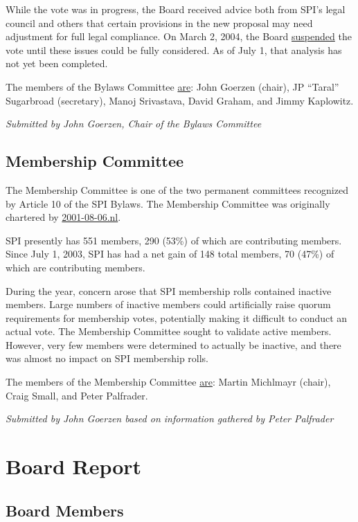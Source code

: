 \documentclass[letterpaper]{report}
\begin{document}
While the vote was in progress, the Board received advice both from
SPI's legal council and others that certain provisions in the new
proposal may need adjustment for full legal compliance. On March 2,
2004, the Board \href{http://lists.spi-inc.org/pipermail/spi-announce/2004/000073.html}{suspended}
the vote until these issues could be fully considered. As of July
1, that analysis has not yet been completed.

The members of the Bylaws Committee \href{http://lists.spi-inc.org/pipermail/spi-bylaws/2003/000003.html}{are}:
John Goerzen (chair), JP ``Taral'' Sugarbroad (secretary), Manoj
Srivastava, David Graham, and Jimmy Kaplowitz.

\emph{Submitted by John Goerzen, Chair of the Bylaws Committee}


\section{Membership Committee}

The Membership Committee is one of the two permanent committees recognized
by Article 10 of the SPI Bylaws. The Membership Committee was originally
chartered by \href{http://www.spi-inc.org/corporate/resolutions/2001/2001-08-06.nl}{2001-08-06.nl}.

SPI presently has 551 members, 290 (53\%) of which are contributing
members. Since July 1, 2003, SPI has had a net gain of 148 total members,
70 (47\%) of which are contributing members.

During the year, concern arose that SPI membership rolls contained
inactive members. Large numbers of inactive members could artificially
raise quorum requirements for membership votes, potentially making
it difficult to conduct an actual vote. The Membership Committee sought
to validate active members. However, very few members were determined
to actually be inactive, and there was almost no impact on SPI membership
rolls.

The members of the Membership Committee \href{http://www.spi-inc.org/corporate/minutes/20030311}{are}:
Martin Michlmayr (chair), Craig Small, and Peter Palfrader.

\emph{Submitted by John Goerzen based on information gathered by Peter
Palfrader}


\chapter{Board Report}


\section{Board Members}
\end{document}
